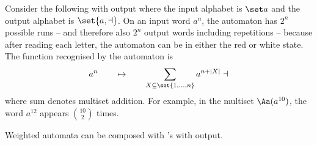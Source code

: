 \begin{example}
Consider the following \nfa  with output where the input alphabet is $\set a$ and the output alphabet is $\set{a, \dashv}$. 
On an input word  $a^n$, the automaton has $2^n$ possible runs -- and therefore also $2^n$ output words including repetitions --  because after reading each letter, the automaton can be in either the red or white state. The function recognised by the automaton is 
\begin{align*}
a^n \qquad \mapsto \qquad     \sum_{X \subseteq  \set{1,\ldots,n}}     a^{n+|X|} \dashv 
\end{align*}
where sum denotes multiset addition.	For example, in the multiset $\Aa(a^{10})$, the word $a^{12}$ appears $10 \choose 2$ times.
\end{example}

Weighted automata can be composed with \nfa's with output.

